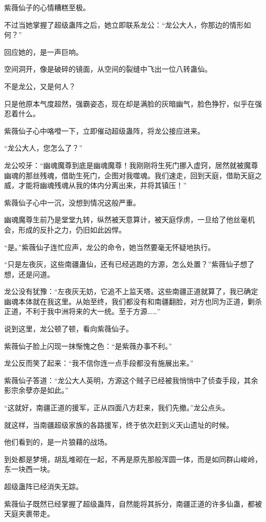 \begin{this_body}
紫薇仙子的心情糟糕至极。

不过当她掌握了超级蛊阵之后，她立即联系龙公：“龙公大人，你那边的情形如何？”

回应她的，是一声巨响。

空间洞开，像是破碎的镜面，从空间的裂缝中飞出一位八转蛊仙。

不是龙公，又是何人？

只是他原本气度超然，强霸姿态，现在却是满脸的灰暗幽气，脸色狰狞，似乎在强忍着什么。

紫薇仙子心中咯噔一下，立即催动超级蛊阵，将龙公接应进来。

“龙公大人，您怎么了？”

龙公咬牙：“幽魂魔尊到底是幽魂魔尊！我刚刚将生死门挪入虚窍，居然就被魔尊幽魂的那丝残魂，借助生死门，企图对我噬魂。我们速走，回到天庭，借助天庭之威，才能将幽魂残魂从我的体内分离出来，并将其镇压！”

紫薇仙子心中一沉，没想到情况这般严重。

幽魂魔尊生前乃是堂堂九转，纵然被天意算计，被天庭俘虏，一旦给了他丝毫机会，形成的反扑之力，仍旧如此凶悍。

“是。”紫薇仙子连忙应声，龙公的命令，她当然要毫无怀疑地执行。

“只是左夜灰，这些南疆蛊仙，还有已经逃跑的方源，怎么处置？”紫薇仙子想了想，还是问道。

龙公没有犹豫：“左夜灰无妨，它追不上监天塔。这些南疆正道就算了，我已确定幽魂本体就在我这里。从始至终，我们都没有和南疆翻脸，对方也同为正道，剿杀正道，不利于我中洲将来的大一统。至于方源……”

说到这里，龙公顿了顿，看向紫薇仙子。

紫薇仙子脸上闪现一抹惭愧之色：“是紫薇办事不利。”

龙公反而笑了起来：“我不信你连一点手段都没有施展出来。”

紫薇仙子答道：“龙公大人英明，方源这个贼子已经被我悄悄中了侦查手段，其余影宗余孽亦是如此。”

“这就好，南疆正道的援军，正从四面八方赶来，我们先撤。”龙公点头。

就这样，当南疆超级家族的各路援军，终于依次赶到义天山遗址的时候。

他们看到的，是一片狼藉的战场。

到处都是梦境，胡乱堆砌在一起，不再是原先那般浑圆一体，而是如同群山峻岭，东一块西一块。

超级蛊阵已经消失无踪。

紫薇仙子既然已经掌握了超级蛊阵，自然能将其拆分，南疆正道的许多仙蛊，都被天庭夹裹带走。


\end{this_body}

